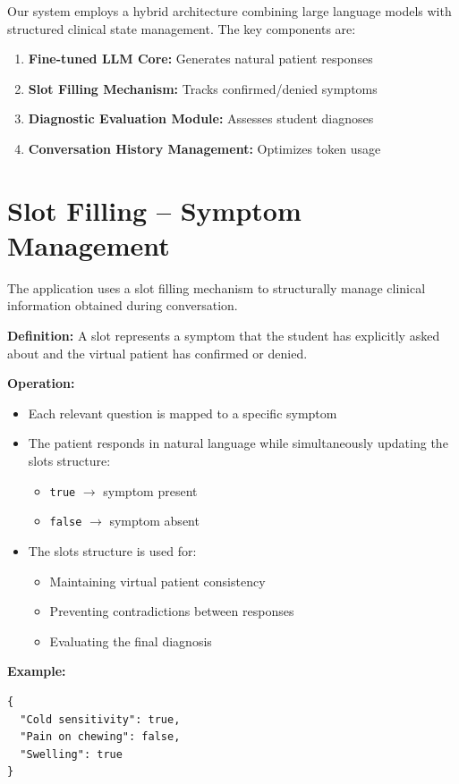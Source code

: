 \documentclass[runningheads,a4paper,11pt]{report}
\begin{document}
Our system employs a hybrid architecture combining large language models with structured clinical state management. The key components are:

\begin{enumerate}
\item \textbf{Fine-tuned LLM Core:} Generates natural patient responses
\item \textbf{Slot Filling Mechanism:} Tracks confirmed/denied symptoms
\item \textbf{Diagnostic Evaluation Module:} Assesses student diagnoses
\item \textbf{Conversation History Management:} Optimizes token usage
\end{enumerate}

\section{Slot Filling – Symptom Management}
\label{section:slotFilling}

The application uses a slot filling mechanism to structurally manage clinical information obtained during conversation.

\textbf{Definition:} A slot represents a symptom that the student has explicitly asked about and the virtual patient has confirmed or denied.

\textbf{Operation:}
\begin{itemize}
\item Each relevant question is mapped to a specific symptom
\item The patient responds in natural language while simultaneously updating the slots structure:
\begin{itemize}
\item \texttt{true} $\rightarrow$ symptom present
\item \texttt{false} $\rightarrow$ symptom absent
\end{itemize}
\item The slots structure is used for:
\begin{itemize}
\item Maintaining virtual patient consistency
\item Preventing contradictions between responses
\item Evaluating the final diagnosis
\end{itemize}
\end{itemize}

\textbf{Example:}
\begin{verbatim}
{
  "Cold sensitivity": true,
  "Pain on chewing": false,
  "Swelling": true
}
\end{verbatim}
\end{document}
